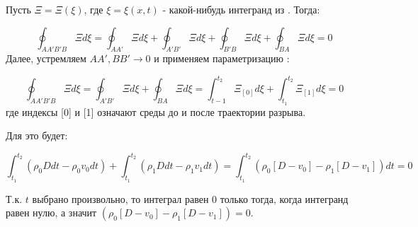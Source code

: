 Пусть $\Xi = \Xi (\xi)$, где $\xi = \xi(x, t)$ - какой-нибудь интегранд из . Тогда:

\begin{equation}
	\oint_{AA'B'B} \Xi d\xi = \oint_{AA'} \Xi d\xi + \oint_{A'B'} \Xi d\xi + \oint_{B'B} \Xi d\xi + \oint_{BA} \Xi d\xi = 0
\end{equation}
Далее, устремляем $AA', BB' \rightarrow 0$ и применяем параметризацию :

\begin{equation}
	\oint_{AA'B'B} \Xi d\xi = \oint_{A'B'} \Xi d\xi + \oint_{BA} \Xi d\xi = \int^{t_2}_{t-1} \Xi_{[0]} d\xi + \int^{t_2}_{t_1} \Xi_{[1]} d\xi = 0
\end{equation}
где индексы [0] и [1] означают среды до и после траектории разрыва.

Для  это будет:

\begin{equation}
	\int^{t_2}_{t_1} (\rho_0 D dt - \rho_0 v_0 dt) + \int^{t_2}_{t_1} (\rho_1 D dt - \rho_1 v_1 dt) = \int^{t_2}_{t_1} (\rho_0 [D-v_0] - \rho_1 [D-v_1]) dt = 0
\end{equation}

Т.к. $t$ выбрано произвольно, то интеграл равен 0 только тогда, когда интегранд равен нулю, а значит $(\rho_0 [D-v_0] - \rho_1 [D-v_1]) = 0$.



\printbibliography

